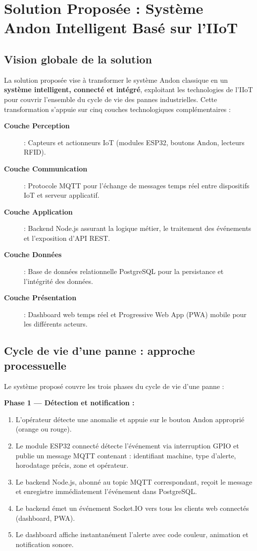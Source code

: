 \section{Solution Proposée : Système Andon Intelligent Basé sur l'IIoT}

\subsection{Vision globale de la solution}

La solution proposée vise à transformer le système Andon classique en un \textbf{système intelligent, connecté et intégré}, exploitant les technologies de l'IIoT pour couvrir l'ensemble du cycle de vie des pannes industrielles. Cette transformation s'appuie sur cinq couches technologiques complémentaires :

\begin{description}
    \item[\textbf{Couche Perception}] : Capteurs et actionneurs IoT (modules ESP32, boutons Andon, lecteurs RFID).
    \item[\textbf{Couche Communication}] : Protocole MQTT pour l'échange de messages temps réel entre dispositifs IoT et serveur applicatif.
    \item[\textbf{Couche Application}] : Backend Node.js assurant la logique métier, le traitement des événements et l'exposition d'API REST.
    \item[\textbf{Couche Données}] : Base de données relationnelle PostgreSQL pour la persistance et l'intégrité des données.
    \item[\textbf{Couche Présentation}] : Dashboard web temps réel et Progressive Web App (PWA) mobile pour les différents acteurs.
\end{description}

\subsection{Cycle de vie d'une panne : approche processuelle}

Le système proposé couvre les trois phases du cycle de vie d'une panne :

\textbf{Phase 1 --- Détection et notification :}
\begin{enumerate}
    \item L'opérateur détecte une anomalie et appuie sur le bouton Andon approprié (orange ou rouge).
    \item Le module ESP32 connecté détecte l'événement via interruption GPIO et publie un message MQTT contenant : identifiant machine, type d'alerte, horodatage précis, zone et opérateur.
    \item Le backend Node.js, abonné au topic MQTT correspondant, reçoit le message et enregistre immédiatement l'événement dans PostgreSQL.
    \item Le backend émet un événement Socket.IO vers tous les clients web connectés (dashboard, PWA).
    \item Le dashboard affiche instantanément l'alerte avec code couleur, animation et notification sonore.
\end{enumerate}

